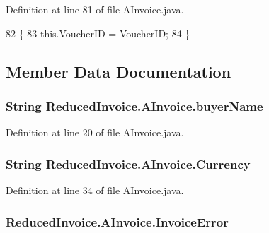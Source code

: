 Definition at line 81 of file A\+Invoice.\+java.


\begin{DoxyCode}
82     \{
83         this.VoucherID = VoucherID;
84     \}
\end{DoxyCode}


\subsection{Member Data Documentation}
\subsubsection[{\texorpdfstring{buyer\+Name}{buyerName}}]{\setlength{\rightskip}{0pt plus 5cm}String Reduced\+Invoice.\+A\+Invoice.\+buyer\+Name\hspace{0.3cm}{\ttfamily [protected]}}\hypertarget{class_reduced_invoice_1_1_a_invoice_ae75bdd20da8fa21dec01c2d032ac11c5}{}\label{class_reduced_invoice_1_1_a_invoice_ae75bdd20da8fa21dec01c2d032ac11c5}


Definition at line 20 of file A\+Invoice.\+java.

\subsubsection[{\texorpdfstring{Currency}{Currency}}]{\setlength{\rightskip}{0pt plus 5cm}String Reduced\+Invoice.\+A\+Invoice.\+Currency\hspace{0.3cm}{\ttfamily [protected]}}\hypertarget{class_reduced_invoice_1_1_a_invoice_a6b6ef26c85bc07f70cb7b4c8eb057fe8}{}\label{class_reduced_invoice_1_1_a_invoice_a6b6ef26c85bc07f70cb7b4c8eb057fe8}


Definition at line 34 of file A\+Invoice.\+java.

\subsubsection[{\texorpdfstring{Invoice\+Error}{InvoiceError}}]{ Reduced\+Invoice.\+A\+Invoice.\+Invoice\+Error\hspace{0.3cm}{\ttfamily [protected]}}\hypertarget{class_reduced_invoice_1_1_a_invoice_a3ef6a3a4efa7e9b652f5399bc76e017a}{}\label{class_reduced_invoice_1_1_a_invoice_a3ef6a3a4efa7e9b652f5399bc76e017a}


